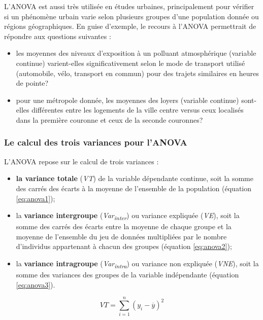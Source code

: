 \documentclass[
  11pt,
  french,
]{book}
\begin{document}
L'ANOVA est aussi très utilisée en études urbaines, principalement pour vérifier si un phénomène urbain varie selon plusieurs groupes d'une population donnée ou régions géographiques. En guise d'exemple, le recours à l'ANOVA permettrait de répondre aux questions suivantes :

\begin{itemize}
\item
  les moyennes des niveaux d'exposition à un polluant atmosphérique (variable continue) varient-elles significativement selon le mode de transport utilisé (automobile, vélo, transport en commun) pour des trajets similaires en heures de pointe?
\item
  pour une métropole donnée, les moyennes des loyers (variable continue) sont-elles différentes entre les logements de la ville centre versus ceux localisés dans la première couronne et ceux de la seconde couronnes?
\end{itemize}

\hypertarget{sect04411}{%
\subsubsection{Le calcul des trois variances pour l'ANOVA}\label{sect04411}}

L'ANOVA repose sur le calcul de trois variances :

\begin{itemize}
\item
  \textbf{la variance totale} (\emph{VT}) de la variable dépendante continue, soit la somme des carrés des écarts à la moyenne de l'ensemble de la population (équation \eqref{eq:anova1});
\item
  la \textbf{variance intergroupe} (\emph{Var\textsubscript{inter}}) ou variance expliquée (\emph{VE}), soit la somme des carrés des écarts entre la moyenne de chaque groupe et la moyenne de l'ensemble du jeu de données multipliées par le nombre d'individus appartenant à chacun des groupes (équation \eqref{eq:anova2});
\item
  la \textbf{variance intragroupe} (\emph{Var\textsubscript{intra}}) ou variance non expliquée (\emph{VNE}), soit la somme des variances des groupes de la variable indépendante (équation \eqref{eq:anova3}).
\end{itemize}

\begin{equation} 
VT=\sum_{i=1}^n (y_{i}-\overline{y})^2
\label{eq:anova1}
\end{equation}
\end{document}
